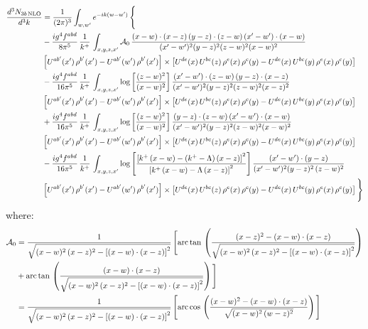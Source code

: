 \documentclass[9pt]{article}
\numberwithin{equation}{section}
\begin{document}
\begin{align}
\frac{d^{3}N_{3b\,\rm NLO}}{d^{3}k} & = \frac{1}{(2\pi)^{3}}\int_{w,w'}e^{-ik(w-w')}\,\Bigg\{\notag \\
&-\frac{ig^{4}f^{abd}}{8\pi^{5}}\,\frac{1}{k^{+}}\,\int_{x,y,z,x'}\mathcal{A}_{0}\,
\frac{(x-w)\cdot(x-z)\,(y-z)\cdot(z-w)\,(x'-w')\cdot(x-w)}{(x'-w')^{2}(y-z)^{2}(z-w)^{2}(x-w)^{2}}\notag \\ & \left[U^{ab'}(x')\,\rho^{b'}(x')-U^{ab'}(w')\, \rho^{b'}(x')\right]\times \left[U^{de}(x)\,U^{bc}(z)\, \rho^{e}(x)\,\rho^{c}(y)-U^{de}(x)\,U^{bc}(y)\,\rho^{e}(x)\,\rho^{c}(y)\right] \notag \\
& -\frac{ig^{4}f^{abd}}{16\pi^{5}}\,\frac{1}{k^{+}}\,\int_{x,y,z,x'}\log{\left[\frac{(z-w)^{2}}{(x-w)^{2}}\right]}\,
\frac{(x'-w')\cdot(z-w)\,(y-z)\cdot(x-z)}{(x'-w')^{2}(y-z)^{2}(z-w)^{2}(x-z)^{2}}\notag \\
&\left[U^{ab'}(x')\,\rho^{b'}(x')-U^{ab'}(w')\, \rho^{b'}(x')\right]\times \left[U^{de}(x)\,U^{bc}(z)\, \rho^{e}(x)\,\rho^{c}(y)-U^{de}(x)\,U^{bc}(y)\,\rho^{e}(x)\,\rho^{c}(y)\right] \notag \\
&+ \frac{ig^{4}f^{abd}}{16\pi^{5}}\,\frac{1}{k^{+}}\,\int_{x,y,z,x'}\log{\left[\frac{(z-w)^{2}}{(x-w)^{2}}\right]}\,
\frac{(y-z)\cdot(z-w)\,(x'-w')\cdot(x-w)}{(x'-w')^{2}(y-z)^{2}(z-w)^{2}(x-w)^{2}}\notag \\ 
& \left[U^{ab'}(x')\,\rho^{b'}(x')-U^{ab'}(w')\, \rho^{b'}(x')\right]\times \left[U^{de}(x)\,U^{bc}(z)\, \rho^{e}(x)\,\rho^{c}(y)-U^{de}(x)\,U^{bc}(y)\,\rho^{e}(x)\,\rho^{c}(y)\right]\notag \\ &  -\frac{ig^{4}f^{abd}}{16\pi^{5}}\,\frac{1}{k^{+}}\,\int_{x,y,z,x'}\log{\left[\frac{\left[k^{+}\,(x-w)-(k^{+}-\Lambda)\,(x-z)\right]^{2}}{\left[k^{+}\,(x-w)-\Lambda\,(x-z)\right]^{2}}\right]}\,\frac{(x'-w')\cdot(y-z)}{(x'-w')^{2}(y-z)^{2}\,(z-w)^{2}}\notag \\ & \left[U^{ab'}(x')\,\rho^{b'}(x')-U^{ab'}(w')\, \rho^{b'}(x')\right]\times \left[U^{de}(x)\,U^{bc}(z)\, \rho^{e}(x)\,\rho^{c}(y)-U^{de}(x)\,U^{bc}(y)\,\rho^{e}(x)\,\rho^{c}(y)\right]\Bigg\}
\end{align}
where: \begin{align}
\mathcal{A}_{0} & = \frac{1}{\sqrt{(x-w)^{2}\,(x-z)^{2}-\left[(x-w)\cdot (x-z)\right]^{2}}}\, \Bigg[\mathrm{arc\,tan}\,\left(\frac{(x-z)^{2}-(x-w)\cdot (x-z)}{\sqrt{(x-w)^{2}\,(x-z)^{2}-\left[(x-w)\cdot (x-z)\right]^{2}}}\right)\notag \\ & + \mathrm{arc\,tan}\,\left(\frac{(x-w)\cdot (x-z)}{\sqrt{(x-w)^{2}\,(x-z)^{2}-\left[(x-w)\cdot (x-z)\right]^{2}}}\right) \Bigg]\notag \\ & = \frac{1}{\sqrt{(x-w)^{2}\,(x-z)^{2}-\left[(x-w)\cdot (x-z)\right]^{2}}}\, \Bigg[\mathrm{arc\,cos}\,\left(\frac{(x-w)^{2}-(x-w)\cdot (x-z)}{\sqrt{(x-w)^{2}\,(w-z)^{2}}}\right)\Bigg]
\end{align}
\end{document}
